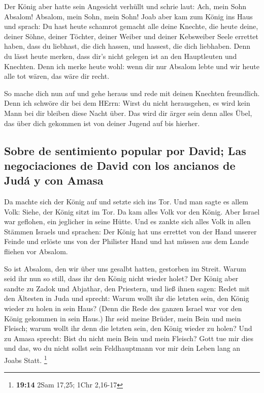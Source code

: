  Der König aber hatte sein Angesicht verhüllt und schrie
laut: Ach, mein Sohn Absalom! Absalom, mein Sohn, mein Sohn!
 Joab aber kam zum König ins Haus und sprach: Du hast
heute schamrot gemacht alle deine Knechte, die heute deine, deiner
Söhne, deiner Töchter, deiner Weiber und deiner Kebsweiber Seele
errettet haben,  dass du liebhast, die dich hassen, und
hassest, die dich liebhaben. Denn du lässt heute merken, dass dir's
nicht gelegen ist an den Hauptleuten und Knechten. Denn ich merke heute
wohl: wenn dir nur Absalom lebte und wir heute alle tot wären, das wäre
dir recht.

 So mache dich nun auf und gehe heraus und rede mit deinen
Knechten freundlich. Denn ich schwöre dir bei dem HErrn: Wirst du nicht
herausgehen, es wird kein Mann bei dir bleiben diese Nacht über. Das
wird dir ärger sein denn alles Übel, das über dich gekommen ist von
deiner Jugend auf bis hierher.

\hypertarget{sobre-de-sentimiento-popular-por-david-las-negociaciones-de-david-con-los-ancianos-de-juduxe1-y-con-amasa}{%
\subsection{Sobre de sentimiento popular por David; Las negociaciones de
David con los ancianos de Judá y con
Amasa}\label{sobre-de-sentimiento-popular-por-david-las-negociaciones-de-david-con-los-ancianos-de-juduxe1-y-con-amasa}}

 Da machte sich der König auf und setzte sich ins Tor. Und
man sagte es allem Volk: Siehe, der König sitzt im Tor. Da kam alles
Volk vor den König. Aber Israel war geflohen, ein jeglicher in seine
Hütte.  Und es zankte sich alles Volk in allen Stämmen
Israels und sprachen: Der König hat uns errettet von der Hand unserer
Feinde und erlöste uns von der Philister Hand und hat müssen aus dem
Lande fliehen vor Absalom.

 So ist Absalom, den wir über uns gesalbt hatten,
gestorben im Streit. Warum seid ihr nun so still, dass ihr den König
nicht wieder holet?  Der König aber sandte zu Zadok und
Abjathar, den Priestern, und ließ ihnen sagen: Redet mit den Ältesten in
Juda und sprecht: Warum wollt ihr die letzten sein, den König wieder zu
holen in sein Haus? (Denn die Rede des ganzen Israel war vor den König
gekommen in sein Haus.)  Ihr seid meine Brüder, mein Bein
und mein Fleisch; warum wollt ihr denn die letzten sein, den König
wieder zu holen?  Und zu Amasa sprecht: Bist du nicht
mein Bein und mein Fleisch? Gott tue mir dies und das, wo du nicht
sollst sein Feldhauptmann vor mir dein Leben lang an Joabs Statt.
\footnote{\textbf{19:14} 2Sam 17,25; 1Chr 2,16-17}


